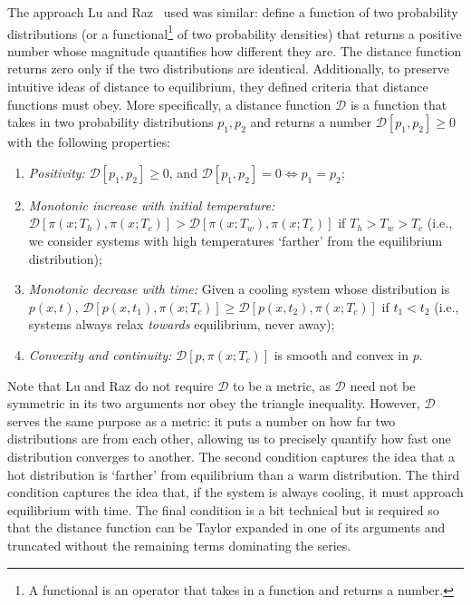 \documentclass[hyperref={colorlinks=true, urlcolor=blue, citecolor=blue, final, bound}]{sfuthesis}
\begin{document}
The approach Lu and Raz~\cite{Lu2017} used was similar: define a function of two probability distributions (or a functional\footnote{A functional is an operator that takes in a function and returns a number.} of two probability densities) that returns a positive number whose magnitude quantifies how different they are. The distance function returns zero only if the two distributions are identical. Additionally, to preserve intuitive ideas of distance to equilibrium, they defined criteria that distance functions must obey. More specifically, a distance function $\mathscr D$ is a function that takes in two probability distributions $p_1,p_2$ and returns a number $\mathscr D[p_1, p_2] \geq 0$ with the following properties: 
\begin{enumerate}
    \item \textit{Positivity:} $\mathscr D[p_1,p_2] \geq 0$, and $\mathscr D[p_1,p_2] = 0 \iff p_1=p_2$;
    \item \textit{Monotonic increase with initial temperature:} \\$\mathscr D[\pi(x;T_h), \pi(x;T_c)] > \mathscr D[\pi(x;T_w), \pi(x;T_c)]$ if $T_h>T_w>T_c$ (i.e., we consider systems with high temperatures `farther' from the equilibrium distribution);
    \item \textit{Monotonic decrease with time:} Given a cooling system whose distribution is $p(x,t)$, $\mathscr D[p(x,t_1),\pi(x;T_c)] \geq \mathscr D[p(x,t_2),\pi(x;T_c)]$ if $t_1<t_2$ (i.e., systems always relax \textit{towards} equilibrium, never away);
    \item \textit{Convexity and continuity:} $\mathscr D[p, \pi(x;T_c)]$ is smooth and convex in $p$. 
\end{enumerate}
Note that Lu and Raz do not require $\mathscr D$ to be a metric, as $\mathscr D$ need not be symmetric in its two arguments nor obey the triangle inequality. However, $\mathscr D$ serves the same purpose as a metric: it puts a number on how far two distributions are from each other, allowing us to precisely quantify how fast one distribution converges to another. The second condition captures the idea that a hot distribution is `farther' from equilibrium than a warm distribution. The third condition captures the idea that, if the system is always cooling, it must approach equilibrium with time. The final condition is a bit technical but is required so that the distance function can be Taylor expanded in one of its arguments and truncated without the remaining terms dominating the series. 
\end{document}
